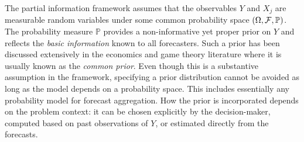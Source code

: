 \documentclass[11pt]{article}
\renewcommand{\P}{\mathbb{P}}
\theoremstyle{definition}
\theoremstyle{definition}
\def\F{{\cal F}}
\def\P{{\mathbb P}}
\begin{document}
The partial information framework assumes that the observables $Y$ and $X_j$ are measurable random variables under some common probability space $(\Omega, \F , \P)$.  The probability measure $\P$ provides a non-informative yet proper  prior on $Y$ and  reflects the \textit{basic information} known to all forecasters. 
Such a prior has been discussed extensively in the economics and game theory literature where it is usually known as the \textit{common prior}. 
Even though this is a substantive assumption in the framework, specifying a prior distribution cannot be avoided as
long as the model depends on a probability space. This includes essentially any probability
model for forecast aggregation. How the prior is incorporated depends on the problem context: it can be chosen explicitly by the decision-maker, computed based on past observations of $Y$, or estimated directly from the forecasts. 

\end{document}
